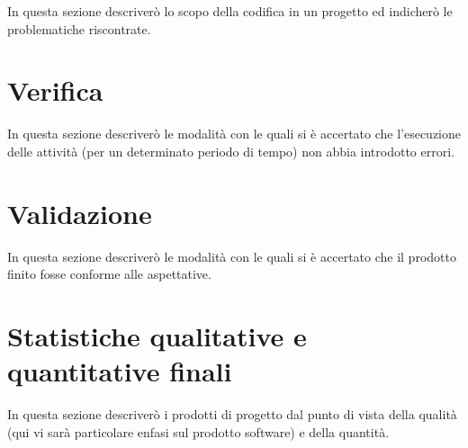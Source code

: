 In questa sezione descriverò lo scopo della codifica in un progetto ed indicherò le problematiche riscontrate.

\section{Verifica}

In questa sezione descriverò le modalità con le quali si è accertato che l’esecuzione delle attività (per un determinato periodo di tempo) non abbia introdotto errori.

\section{Validazione}

In questa sezione descriverò le modalità con le quali si è accertato che il prodotto finito fosse conforme alle aspettative.

\section{Statistiche qualitative e quantitative finali}

In questa sezione descriverò i prodotti di progetto dal punto di vista della qualità (qui vi sarà particolare enfasi sul prodotto software) e della quantità.